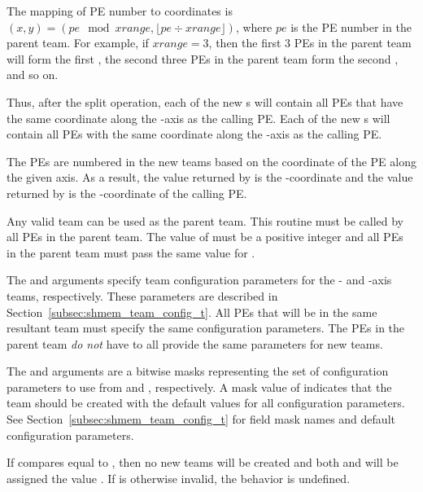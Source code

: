 \begin{apidefinition}
{The mapping of \ac{PE} number to coordinates is $(x, y) = ( pe \mod xrange, \lfloor pe \div xrange \rfloor )$,
where $pe$ is the \ac{PE} number in the parent team. For example, if $xrange = 3$,
then the first 3 \acp{PE} in the parent team will form the first
, the second three \acp{PE} in the parent team form the second ,
and so on.

Thus, after the split operation, each of the new s will contain all \acp{PE} that
have the same coordinate along the -axis as the calling \ac{PE}. Each of the
new s will contain all \acp{PE} with the same coordinate along the
-axis as the calling \ac{PE}.

The \acp{PE} are numbered in the new teams based on the coordinate of the
\ac{PE} along the given axis. As a result,
the value returned by  is the
-coordinate and the value returned by 
is the -coordinate of the calling \ac{PE}.

Any valid \openshmem team can be used as the parent team. This routine must be
called by all \acp{PE} in the parent team. The value of  must be
a positive integer and all \acp{PE} in the parent team must pass the same value for
.

The  and  arguments specify team
configuration parameters for the - and -axis teams, respectively.
These parameters are described in Section~\ref{subsec:shmem_team_config_t}.
All \acp{PE} that will be in the same resultant team must specify the same
configuration parameters.
The \acp{PE} in the parent team \emph{do not} have to all provide the same
parameters for new teams.

The  and  arguments are a bitwise masks
representing the set of configuration parameters to use from
 and , respectively.
A mask value of  indicates that the team
should be created with the default values for all configuration parameters.
See Section~\ref{subsec:shmem_team_config_t} for field mask names and
default configuration parameters.

If  compares equal to
, then no new teams will be created
and both  and  will be assigned the
value .
If  is otherwise invalid, the behavior is undefined.

}
\end{apidefinition}

